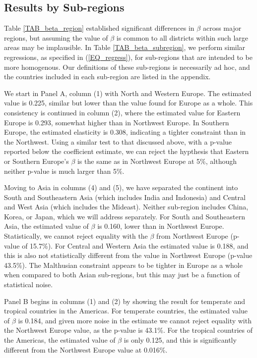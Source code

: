 \documentclass[11pt]{article}
\begin{document}
\subsection{Results by Sub-regions}
Table \ref{TAB_beta_region} established significant differences in $\beta$ across major regions, but assuming the value of $\beta$ is common to all districts within such large areas may be implausible. In Table \ref{TAB_beta_subregion}, we perform similar regressions, as specified in (\ref{EQ_regress}), for sub-regions that are intended to be more homogenous. Our definitions of these sub-regions is necessarily ad hoc, and the countries included in each sub-region are listed in the appendix.

We start in Panel A, column (1) with North and Western Europe. The estimated value is 0.225, similar but lower than the value found for Europe as a whole. This consistency is continued in column (2), where the estimated value for Eastern Europe is 0.293, somewhat higher than in Northwest Europe. In Southern Europe, the estimated elasticity is 0.308, indicating a tighter constraint than in the Northwest. Using a similar test to that discussed above, with a p-value reported below the coefficient estimate, we can reject the hypthesis that Eastern or Southern Europe's $\beta$ is the same as in Northwest Europe at 5\%, although neither p-value is much larger than 5\%. 

Moving to Asia in columns (4) and (5), we have separated the continent into South and Southeastern Asia (which includes India and Indonesia) and Central and West Asia (which includes the Mideast). Neither sub-region includes China, Korea, or Japan, which we will address separately. For South and Southeastern Asia, the estimated value of $\beta$ is 0.160, lower than in Northwest Europe. Statistically, we cannot reject equality with the $\beta$ from Northwest Europe (p-value of 15.7\%). For Central and Western Asia the estimated value is 0.188, and this is also not statistically different from the value in Northwest Europe (p-value 43.5\%). The Malthusian constraint appears to be tighter in Europe as a whole when compared to both Asian sub-regions, but this may just be a function of statistical noise.

Panel B begins in columns (1) and (2) by showing the result for temperate and tropical countries in the Americas. For temperate countries, the estimated value of $\beta$ is 0.184, and given more noise in the estimate we cannot reject equality with the Northwest Europe value, as the p-value is 43.1\%. For the tropical countries of the Americas, the estimated value of $\beta$ is only 0.125, and this is significantly different from the Northwest Europe value at 0.016\%.
\end{document}
